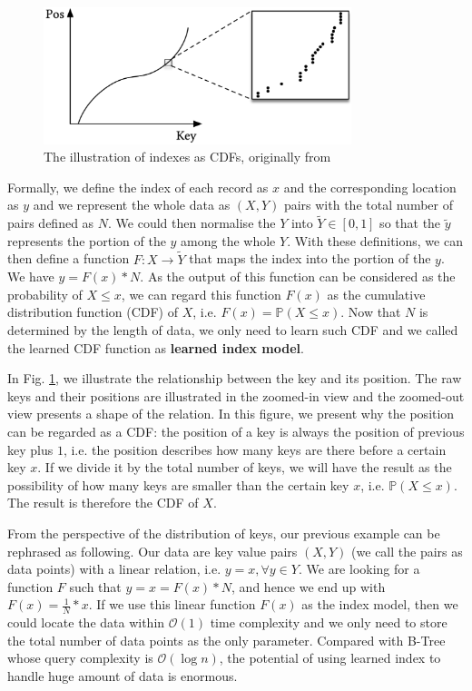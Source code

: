 \begin{figure}[!htb]
\centering
\includegraphics[width=0.8\textwidth]{graphs/introduction/cdf_assumptions}
\caption{The illustration of indexes as CDFs, originally from \cite{kraska2018case}}
\label{fig:indexes_as_cdf}
\end{figure}


Formally, we define the index of each record as $x$ and the corresponding location as $y$ and we represent the whole data as $(X, Y)$ pairs with the total number of pairs defined as $N$. We could then normalise the $Y$ into $\tilde{Y}\in[0,1]$ so that the $\tilde{y}$ represents the portion of the $y$ among the whole $Y$. With these definitions, we can then define a function $F:X\to \tilde{Y}$ that maps the index into the portion of the $y$. We have $y=F(x)* N$. As the output of this function can be considered as the probability of $X\leq x$, we can regard this function $F(x)$ as the cumulative distribution function (CDF) of $X$, i.e. $F(x)=\mathbb{P}(X\leq x)$. Now that $N$ is determined by the length of data, we only need to learn such CDF and we called the learned CDF function as \textbf{learned index model}.

In Fig. \ref{fig:indexes_as_cdf}, we illustrate the relationship between the key and its position. The raw keys and their positions are illustrated in the zoomed-in view and the zoomed-out view presents a shape of the relation. In this figure, we present why the position can be regarded as a CDF: the position of a key is always the position of previous key plus $1$, i.e. the position describes how many keys are there before a certain key $x$. If we divide it by the total number of keys, we will have the result as the possibility of how many keys are smaller than the certain key $x$, i.e. $\mathbb{P}(X\leq x)$. The result is therefore the CDF of $X$.

\begin{mscexample}
	From the perspective of the distribution of keys, our previous example can be rephrased as following. Our data are key value pairs $(X, Y)$ (we call the pairs as data points) with a linear relation, i.e. $y=x, \forall y\in Y$. We are looking for a function $F$ such that $y=x=F(x)* N$, and hence we end up with $F(x)=\frac{1}{N}*x$. If we use this linear function $F(x)$ as the index model, then we could locate the data within $\mathcal{O}(1)$ time complexity and we only need to store the total number of data points as the only parameter. Compared with B-Tree whose query complexity is $\mathcal{O}(\log n)$, the potential of using learned index to handle huge amount of data is enormous. 
\end{mscexample}

